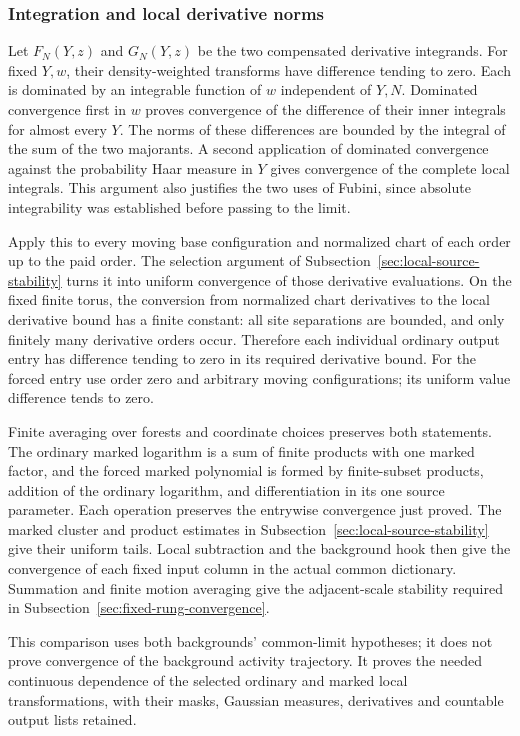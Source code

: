 \subsubsection{Integration and local derivative norms}
Let $F_N(Y,z)$ and $G_N(Y,z)$ be the two compensated derivative
integrands. For fixed $Y,w$, their density-weighted transforms
have difference tending to zero. Each is dominated by an
integrable function of $w$ independent of $Y,N$. Dominated
convergence first in $w$ proves convergence of the difference
of their inner integrals for almost every $Y$. The norms of
these differences are bounded by the integral of the sum of
the two majorants. A second application of dominated convergence
against the probability Haar measure in $Y$ gives convergence
of the complete local integrals. This argument also justifies
the two uses of Fubini, since absolute integrability was established
before passing to the limit.

Apply this to every moving base configuration and normalized
chart of each order up to the paid order. The selection argument
of Subsection~\ref{sec:local-source-stability} turns it into
uniform convergence of those derivative evaluations. On the
fixed finite torus, the conversion from normalized chart
derivatives to the local derivative bound has a finite constant:
all site separations are bounded, and only finitely many derivative
orders occur. Therefore each individual ordinary output entry
has difference tending to zero in its required derivative bound.
For the forced entry use order zero and arbitrary moving
configurations; its uniform value difference tends to zero.

Finite averaging over forests and coordinate choices preserves
both statements. The ordinary marked logarithm is a sum of
finite products with one marked factor, and the forced marked
polynomial is formed by finite-subset products, addition of the
ordinary logarithm, and differentiation in its one source
parameter. Each operation preserves the entrywise convergence
just proved. The marked cluster and product estimates in
Subsection~\ref{sec:local-source-stability} give their uniform
tails. Local subtraction and the background hook then give
the convergence of each fixed input column in the actual
common dictionary. Summation and finite motion averaging give
the adjacent-scale stability required in
Subsection~\ref{sec:fixed-rung-convergence}.

This comparison uses both backgrounds' common-limit hypotheses;
it does not prove convergence of the background activity trajectory.
It proves the needed continuous dependence of the selected
ordinary and marked local transformations, with their masks,
Gaussian measures, derivatives and countable output lists retained.
